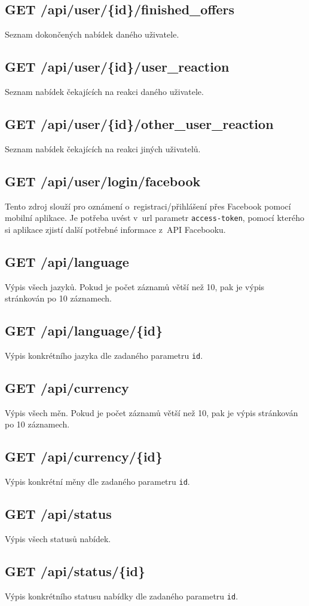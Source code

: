 \subsection{GET /api/user/\{id\}/finished\_offers}
Seznam dokončených nabídek daného uživatele.

\subsection{GET /api/user/\{id\}/user\_reaction}
Seznam nabídek čekajících na reakci daného uživatele.

\subsection{GET /api/user/\{id\}/other\_user\_reaction}
Seznam nabídek čekajících na reakci jiných uživatelů.

\subsection{GET /api/user/login/facebook}
Tento zdroj slouží pro oznámení o~registraci/přihlášení přes Facebook pomocí mobilní aplikace. Je potřeba uvést v~url parametr \texttt{access-token}, pomocí kterého si aplikace zjistí další potřebné informace z~API Facebooku.

\subsection{GET /api/language}
Výpis všech jazyků. Pokud je počet záznamů větší než 10, pak je výpis stránkován po 10 záznamech.

\subsection{GET /api/language/\{id\}}
Výpis konkrétního jazyka dle zadaného parametru \texttt{id}.

\subsection{GET /api/currency}
Výpis všech měn. Pokud je počet záznamů větší než 10, pak je výpis stránkován po 10 záznamech.

\subsection{GET /api/currency/\{id\}}
Výpis konkrétní měny dle zadaného parametru \texttt{id}.

\subsection{GET /api/status}
Výpis všech statusů nabídek.

\subsection{GET /api/status/\{id\}}
Výpis konkrétního statusu nabídky dle zadaného parametru \texttt{id}.